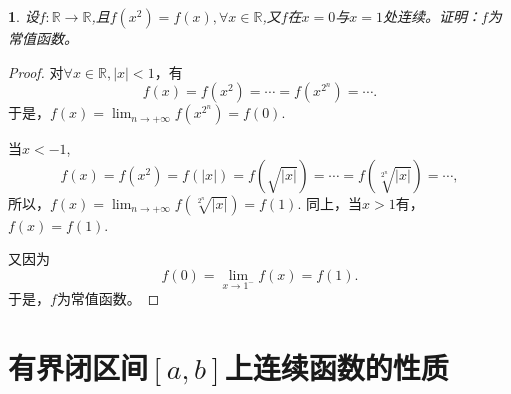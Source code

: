 \documentclass[utf8]{book}
\newtheorem{example}{}[section]             %
\begin{document}
\begin{example}
设$f:\mathbb{R}\rightarrow\mathbb{R}$,且$f(x^2)=f(x),\forall x\in\mathbb{R}$,又$f$在$x=0$与$x=1$处连续。证明：$f$为常值函数。
\end{example}
\begin{proof}对$\forall x\in\mathbb{R}, |x| < 1$，有
$$f(x) = f(x^2)=\cdots = f(x^{2^n})=\cdots.$$
于是，$f(x) = \displaystyle\lim_{n\to +\infty}f(x^{2^n}) = f(0)$.

当$x<-1$, $$f(x) = f(x^2) = f(|x|) = f(\sqrt{|x|})=\cdots =f(\sqrt[2^n]{|x|})=\cdots,$$
所以，$f(x) = \displaystyle\lim_{n\to +\infty}f(\sqrt[2^n]{|x|})=f(1)$.
同上，当$x > 1$有，$f(x) = f(1)$.

又因为
$$f(0) = \displaystyle\lim_{x\to 1^-}f(x)=f(1).$$
于是，$f$为常值函数。
\end{proof}
\section{有界闭区间$[a,b]$上连续函数的性质}
\end{document}
